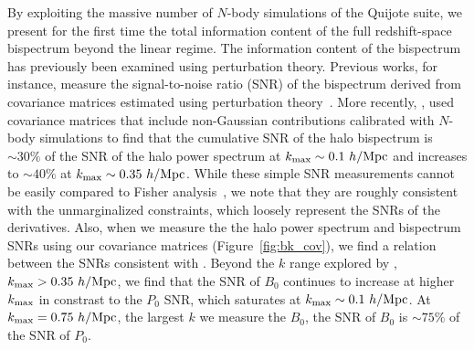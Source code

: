 By exploiting the massive number of $N$-body simulations of the Quijote 
suite, we present for the first time the total information content of the 
full redshift-space bispectrum beyond the linear regime. The information content 
of the bispectrum has previously been examined using perturbation 
theory. Previous works, for instance, measure the signal-to-noise ratio (SNR) 
of the bispectrum derived from covariance matrices estimated using perturbation 
theory~\citep{sefusatti2005, sefusatti2006, chan2017}. More recently, \cite{chan2017},
used covariance matrices that include non-Gaussian contributions calibrated with 
$N$-body simulations to find that the cumulative SNR of the halo bispectrum is 
$\sim 30\%$ of the SNR of the halo power spectrum at $k_{\rm max} \sim 0.1~h/{\rm Mpc}$ 
and increases to $\sim 40\%$ at $k_{\rm max}\sim 0.35~h/{\rm Mpc}$. While these simple 
SNR measurements cannot be easily compared to Fisher analysis~\citep{repp2015, blot2016}, 
we note that they are roughly consistent with the unmarginalized constraints, 
which loosely represent the SNRs of the derivatives. 
Also, when we measure the the halo power spectrum and bispectrum SNRs using our 
covariance matrices (Figure~\ref{fig:bk_cov}), we find a relation between the 
SNRs consistent with \cite{chan2017}. Beyond the $k$ range explored by \cite{chan2017},  
$k_{\rm max}>0.35~h/{\rm Mpc}$, we find that the SNR of $B_0$ continues to increase 
at higher $k_{\rm max}$ in constrast to the $P_0$ SNR, which saturates at 
$k_{\rm max}\sim 0.1~h/{\rm Mpc}$. At $k_{\rm max} = 0.75~h/{\rm Mpc}$, the largest $k$ we 
measure the $B_0$, the SNR of $B_0$ is $\sim75\%$ of the SNR of $P_0$.

